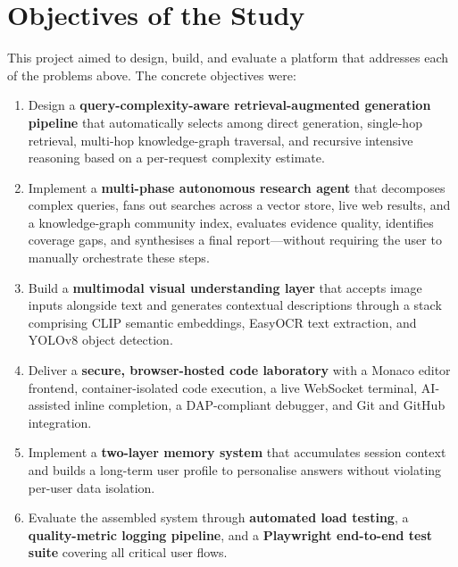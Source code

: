 \section{Objectives of the Study}
\label{sec:objectives}

This project aimed to design, build, and evaluate a platform that addresses each
of the problems above. The concrete objectives were:

\begin{enumerate}
    \item Design a \textbf{query-complexity-aware retrieval-augmented generation pipeline}
    that automatically selects among direct generation, single-hop retrieval,
    multi-hop knowledge-graph traversal, and recursive intensive reasoning
    based on a per-request complexity estimate.

    \item Implement a \textbf{multi-phase autonomous research agent} that decomposes
    complex queries, fans out searches across a vector store, live web results,
    and a knowledge-graph community index, evaluates evidence quality, identifies
    coverage gaps, and synthesises a final report---without requiring the user
    to manually orchestrate these steps.

    \item Build a \textbf{multimodal visual understanding layer} that accepts
    image inputs alongside text and generates contextual descriptions through
    a stack comprising CLIP semantic embeddings, EasyOCR text extraction, and
    YOLOv8 object detection.

    \item Deliver a \textbf{secure, browser-hosted code laboratory} with a Monaco
    editor frontend, container-isolated code execution, a live WebSocket
    terminal, AI-assisted inline completion, a DAP-compliant debugger, and
    Git and GitHub integration.

    \item Implement a \textbf{two-layer memory system} that accumulates session
    context and builds a long-term user profile to personalise answers
    without violating per-user data isolation.

    \item Evaluate the assembled system through \textbf{automated load testing},
    a \textbf{quality-metric logging pipeline}, and a \textbf{Playwright
    end-to-end test suite} covering all critical user flows.
\end{enumerate}


